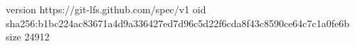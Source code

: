 version https://git-lfs.github.com/spec/v1
oid sha256:b1bc224ac83671a4d9a336427ed7d96c5d22f6cda8f43c8590ce64c7c1a0fe6b
size 24912
